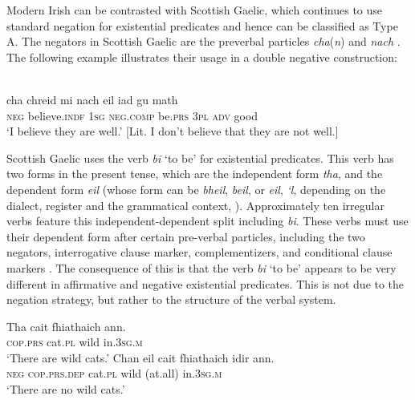 \documentclass[output=paper,colorlinks,citecolor=brown]{langscibook}
\begin{document}
Modern Irish can be contrasted with Scottish
Gaelic, which continues to use standard negation for
existential predicates and hence can be classified as Type A. The negators
in Scottish Gaelic are the preverbal particles \textit{cha}(\textit{n}) and \textit{nach} \citep[61]{Lamb2001}. The following example illustrates their usage in a double negative construction:
%
\begin{exe}\ex
{}\\
    \gll cha  chreid mi nach eil iad gu    math \\
\textsc{neg} believe.\textsc{indf} \textsc{1sg} \textsc{neg}.\textsc{comp} be.\textsc{prs} \textsc{3pl} \textsc{adv} good \\
    \glt `I believe they are well.' [Lit. I don’t believe that they are not well.] 
    \end{exe}
%
Scottish Gaelic uses the verb \textit{bi} `to be' for existential
predicates. This verb has two forms in the present tense, which are the
independent form \textit{tha}, and the dependent form \textit{eil} (whose
form can be \textit{bheil}, \textit{beil}, or \textit{eil}, \textit{‘l},
depending on the dialect, register and the grammatical context,
\citealt[54]{Lamb2001}). Approximately ten irregular verbs feature this independent-dependent split including \textit{bi}.  These verbs must use their dependent form after certain pre-verbal particles, including the two negators, interrogative clause marker, complementizers, and conditional clause markers \citep[50]{Lamb2001}. The consequence of this is that the verb \textit{bi} `to be' appears to be very different in affirmative and negative existential predicates. This is not due to the negation strategy, but rather to the structure of the verbal system.
%
\begin{exe}\ex
{}
\begin{xlist}
\ex\gll Tha cait fhiathaich ann. \\
\textsc{cop}.\textsc{prs} cat.\textsc{pl} wild in.\textsc{3sg.m} \\
    \glt `There are wild cats.'
\ex\gll Chan eil cait fhiathaich \op{}idir\cp{}   ann.\\
    \textsc{neg} \textsc{cop.prs.dep} cat.\textsc{pl} wild (at.all)
    in.\textsc{3sg.m}\\
    \glt `There are no wild cats.'
\end{xlist}\end{exe}
\end{document}
